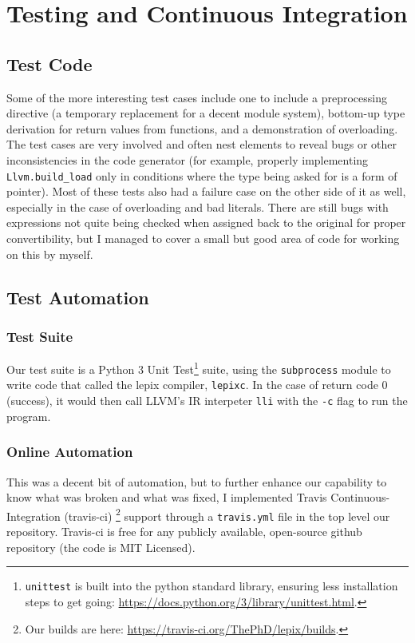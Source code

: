 \chapter{Testing and Continuous Integration}\label{ch:testing}

\section{Test Code}

Some of the more interesting test cases include one to include a preprocessing directive (a temporary replacement for a decent module system), bottom-up type derivation for return values from functions, and a demonstration of overloading. The test cases are very involved and often nest elements to reveal bugs or other inconsistencies in the code generator (for example, properly implementing \lstinline|Llvm.build_load| only in conditions where the type being asked for is a form of pointer). Most of these tests also had a failure case on the other side of it as well, especially in the case of overloading and bad literals. There are still bugs with expressions not quite being checked when assigned back to the original for proper convertibility, but I managed to cover a small but good area of code for working on this by myself.

\pagebreak{}





\section{Test Automation}
\subsection{Test Suite}
Our test suite is a Python 3 Unit Test\footnote{\lstinline|unittest| is built into the python standard library, ensuring less installation steps to get going: \url{https://docs.python.org/3/library/unittest.html}.} suite, using the \lstinline|subprocess| module to write code that called the lepix compiler, \lstinline|lepixc|. In the case of return code 0 (success), it would then call LLVM's IR interpeter \lstinline|lli| with the \lstinline|-c| flag to run the program.

\subsection{Online Automation}
This was a decent bit of automation, but to further enhance our capability to know what was broken and what was fixed, I implemented Travis Continuous-Integration (travis-ci) \footnote{Our builds are here: \url{https://travis-ci.org/ThePhD/lepix/builds}.} support through a \lstinline|travis.yml| file in the top level our repository. Travis-ci is free for any publicly available, open-source github repository (the code is MIT Licensed).

